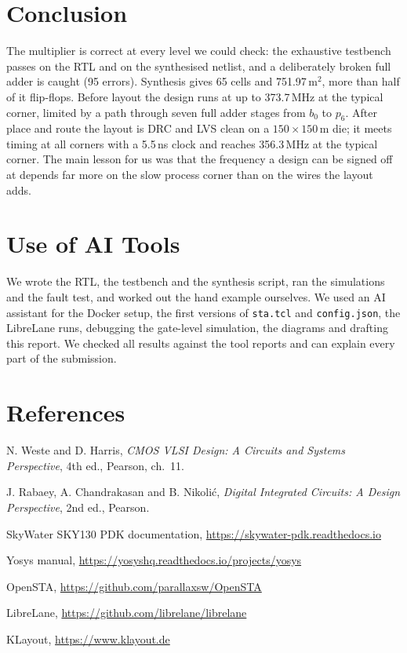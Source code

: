 \documentclass[11pt,a4paper]{article}
\begin{document}
\section{Conclusion}

The multiplier is correct at every level we could check: the exhaustive testbench passes on the
RTL and on the synthesised netlist, and a deliberately broken full adder is caught (95 errors).
Synthesis gives 65 cells and 751.97\,\textmu m$^2$, more than half of it flip-flops. Before layout
the design runs at up to 373.7\,MHz at the typical corner, limited by a path through seven full
adder stages from $b_0$ to $p_6$. After place and route the layout is DRC and LVS clean on a
$150 \times 150$\,\textmu m die; it meets timing at all corners with a 5.5\,ns clock and reaches
356.3\,MHz at the typical corner. The main lesson for us was that the frequency a design can be
signed off at depends far more on the slow process corner than on the wires the layout adds.

\section{Use of AI Tools}

We wrote the RTL, the testbench and the synthesis script, ran the simulations and the fault test,
and worked out the hand example ourselves. We used an AI assistant for the Docker setup,
the first versions of \texttt{sta.tcl} and \texttt{config.json}, the LibreLane runs, debugging the
gate-level simulation, the diagrams and drafting this report. We checked all results against the
tool reports and can explain every part of the submission.

\section*{References}

\begin{enumerate}[label={[\arabic*]}]
  \item N. Weste and D. Harris, \emph{CMOS VLSI Design: A Circuits and Systems Perspective},
        4th ed., Pearson, ch.~11.
  \item J. Rabaey, A. Chandrakasan and B. Nikoli\'c, \emph{Digital Integrated Circuits: A Design
        Perspective}, 2nd ed., Pearson.
  \item SkyWater SKY130 PDK documentation, \url{https://skywater-pdk.readthedocs.io}
  \item Yosys manual, \url{https://yosyshq.readthedocs.io/projects/yosys}
  \item OpenSTA, \url{https://github.com/parallaxsw/OpenSTA}
  \item LibreLane, \url{https://github.com/librelane/librelane}
  \item KLayout, \url{https://www.klayout.de}
\end{enumerate}
\end{document}
